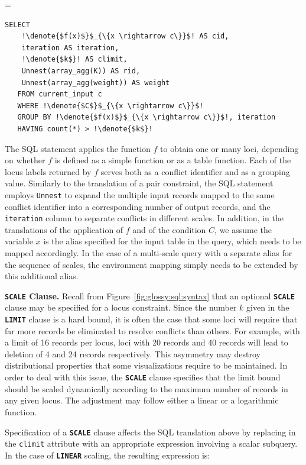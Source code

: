 \documentclass[11pt, oneside]{report}
\newcommand{\minisec}[1]{\noindent\textbf{#1.}}
\newcommand{\denote}[1]{\text{$[\![ $#1$ ]\!]$}}
\begin{document}
\denote{\lstinline!FOREACH LOCUS MAP BY!$\;f(x)\;$\lstinline!  FILTER BY!$\;C\;$\lstinline!LIMIT !$\;k$} =
\begin{lstlisting}[mathescape,escapechar=!]
   SELECT
    !\denote{$f(x)$}$_{\{x \rightarrow c\}}$! AS cid,
    iteration AS iteration,
    !\denote{$k$}! AS climit,
    Unnest(array_agg(K)) AS rid,
    Unnest(array_agg(weight)) AS weight
   FROM current_input c
   WHERE !\denote{$C$}$_{\{x \rightarrow c\}}$!
   GROUP BY !\denote{$f(x)$}$_{\{x \rightarrow c\}}$!, iteration
   HAVING count(*) > !\denote{$k$}!
\end{lstlisting} 
 
The SQL statement applies the function $f$ to obtain one or many loci, depending on whether $f$ is defined as a simple function or as a table function. Each of the locus labels returned by $f$ serves both as a conflict identifier and as a grouping value. Similarly to the translation of a pair constraint, the SQL statement employs \texttt{Unnest} to expand the multiple input records mapped to the same conflict identifier into a corresponding number of output records, and the \texttt{iteration} column to separate conflicts in different scales. In addition, in the translations of the application of $f$ and of the condition $C$, we assume the variable $x$ is the alias specified for the input table in the query, which needs to be mapped accordingly. In the case of a multi-scale query with a separate alias for the sequence of scales, the environment mapping simply needs to be extended by this additional alias. 

\minisec{\texttt{SCALE} Clause}
Recall from Figure~\ref{fig:glossy:sql:syntax} that an optional \textbf{\texttt{SCALE}} clause may be specified for a locus constraint. Since the number $k$ given in the \textbf{\texttt{LIMIT}} clause is a hard bound, it is often the case that some loci will require that far more records be eliminated to resolve conflicts than others. For example, with a limit of 16 records per locus, loci with 20 records and 40 records will lead to deletion of 4 and 24 records respectively. This asymmetry may destroy distributional properties that some visualizations require to be maintained. In order to deal with this issue, the \textbf{\texttt{SCALE}} clause specifies that the limit bound should be scaled dynamically according to the maximum number of records in any given locus. The adjustment may follow either a linear or a logarithmic function.  

Specification of a \textbf{\texttt{SCALE}} clause affects the SQL translation above by replacing \denote{$k$} in the \texttt{climit} attribute with an appropriate expression involving a scalar subquery. In the case of \textbf{\texttt{LINEAR}} scaling, the resulting expression is:
\end{document}
